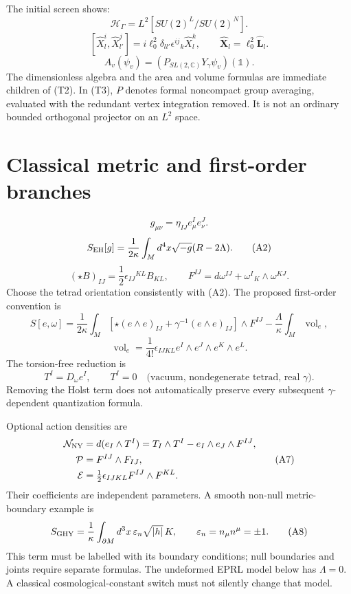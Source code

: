 \documentclass[11pt,a4paper]{article}
\newcommand{\Vol}{\operatorname{vol}}
\newcommand{\eq}[2]{\begin{equation}#2\tag{#1}\end{equation}}
\begin{document}
The initial screen shows:
\eq{T1}{\boxed{\mathcal H_\Gamma=L^2[SU(2)^L/SU(2)^N].}}
\eq{T2}{\boxed{[\hat X_l^i,\hat X_{l'}^j]=i\ell_0^2\delta_{ll'}\epsilon^{ij}{}_k\hat X_l^k,\qquad\hat{\mathbf X}_l=\ell_0^2\hat{\mathbf L}_l.}}
\eq{T3}{\boxed{A_v(\psi_v)=\left(P_{SL(2,\mathbb C)}Y_\gamma\psi_v\right)(\mathbb 1).}}
The dimensionless algebra and the area and volume formulas are immediate children of (T2). In (T3), $P$ denotes formal noncompact group averaging, evaluated with the redundant vertex integration removed. It is not an ordinary bounded orthogonal projector on an $L^2$ space.

\section{Classical metric and first-order branches}
\eq{A1}{g_{\mu\nu}=\eta_{IJ}e^I_\mu e^J_\nu.}
\eq{A2}{S_{\rm EH}[g]=\frac1{2\kappa}\int_Md^4x\sqrt{-g}(R-2\Lambda).}
\eq{A3}{(\star B)_{IJ}=\frac12\epsilon_{IJ}{}^{KL}B_{KL},\qquad F^{IJ}=d\omega^{IJ}+\omega^I{}_K\wedge\omega^{KJ}.}
Choose the tetrad orientation consistently with (A2). The proposed first-order convention is
\eq{A4}{S[e,\omega]=\frac1{2\kappa}\int_M\left[\star(e\wedge e)_{IJ}+\gamma^{-1}(e\wedge e)_{IJ}\right]\wedge F^{IJ}-\frac{\Lambda}{\kappa}\int_M\Vol_e,}
\eq{A5}{\Vol_e=\frac1{4!}\epsilon_{IJKL}e^I\wedge e^J\wedge e^K\wedge e^L.}
The torsion-free reduction is
\eq{A6}{T^I=D_\omega e^I,\qquad T^I=0\quad\text{(vacuum, nondegenerate tetrad, real $\gamma$).}}
Removing the Holst term does not automatically preserve every subsequent $\gamma$-dependent quantization formula.

Optional action densities are
\eq{A7}{\begin{aligned}
\mathcal N_{\rm NY}&=d(e_I\wedge T^I)=T_I\wedge T^I-e_I\wedge e_J\wedge F^{IJ},\\
\mathcal P&=F^{IJ}\wedge F_{IJ},\\
\mathcal E&=\tfrac12\epsilon_{IJKL}F^{IJ}\wedge F^{KL}.
\end{aligned}}
Their coefficients are independent parameters. A smooth non-null metric-boundary example is
\eq{A8}{S_{\rm GHY}=\frac1\kappa\int_{\partial M}d^3x\,\varepsilon_n\sqrt{|h|}\,K,\qquad\varepsilon_n=n_\mu n^\mu=\pm1.}
This term must be labelled with its boundary conditions; null boundaries and joints require separate formulas. The undeformed EPRL model below has $\Lambda=0$. A classical cosmological-constant switch must not silently change that model.
\end{document}
